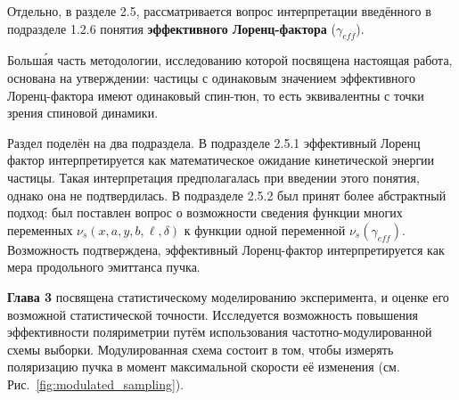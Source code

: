 Отдельно, в разделе 2.5, рассматривается вопрос интерпретации введённого в подразделе 1.2.6 понятия 
\textbf{эффективного Лоренц-фактора} ($\gamma_{eff}$). 

Больш\'{а}я часть методологии, исследованию которой посвящена настоящая работа, основана на утверждении: 
частицы с одинаковым значением эффективного Лоренц-фактора имеют одинаковый спин-тюн, 
то есть эквивалентны с точки зрения спиновой динамики.

Раздел поделён на два подраздела. В подразделе 2.5.1 эффективный Лоренц фактор интерпретируется как 
математическое ожидание кинетической энергии частицы. Такая интерпретация предполагалась при введении
этого понятия, однако она не подтвердилась. В подразделе 2.5.2 был принят более абстрактный подход: 
был поставлен вопрос о возможности сведения функции многих переменных $\nu_s(x,a,y,b,\ell,\delta)$ 
к функции одной переменной $\nu_s(\gamma_{eff})$. Возможность подтверждена, эффективный Лоренц-фактор
интерпретируется как мера продольного эмиттанса пучка.

\textbf{Глава 3} посвящена статистическому моделированию эксперимента, 
и оценке его возможной статистической точности. Исследуется возможность повышения эффективности
поляриметрии путём использования частотно-модулированной схемы выборки. Модулированная схема 
состоит в том, чтобы измерять поляризацию пучка в момент максимальной скорости её изменения 
(см. Рис.~\ref{fig:modulated_sampling}).

